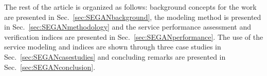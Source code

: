 The rest of the article is organized as follows: background concepts for the work are presented in Sec.~\ref{sec:SEGANbackground}, the modeling method is presented in Sec.~\ref{sec:SEGANmethodology} and the service performance assessment and verification indices are presented in Sec.~\ref{sec:SEGANperformance}. The use of the service modeling and indices are shown through three case studies in Sec.~\ref{sec:SEGANcasestudies} and concluding remarks are presented in Sec.~\ref{sec:SEGANconclusion}.
